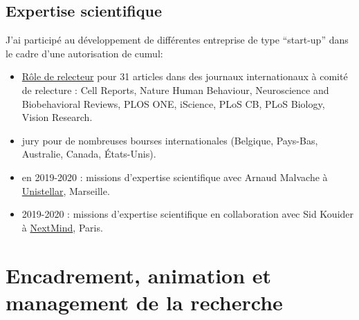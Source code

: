 \documentclass[10pt,french,a4paper,oneside]{article}%
\begin{document}
\subsection{Expertise scientifique} %

J'ai participé au développement de différentes entreprise de type ``start-up'' dans le cadre d'une autorisation de cumul:

\begin{itemize}
	\item \href{https://orcid.org/my-orcid?orcid=0000-0002-9536-010X}{Rôle de relecteur} pour 31 articles dans des journaux internationaux à comité de relecture : Cell Reports, Nature Human Behaviour, Neuroscience and Biobehavioral Reviews, PLOS ONE, iScience, PLoS CB, PLoS Biology, Vision Research.

	\item jury pour de nombreuses bourses internationales (Belgique, Pays-Bas, Australie, Canada, États-Unis).

	\item en 2019-2020 : missions d'expertise scientifique avec Arnaud Malvache à \href{https://unistellaroptics.com/}{Unistellar}, Marseille.

	\item 2019-2020 : missions d'expertise scientifique en collaboration avec Sid Kouider à \href{https://www.next-mind.com/}{NextMind}, Paris.
\end{itemize}

\section{Encadrement, animation et management de la recherche}


\end{document}
